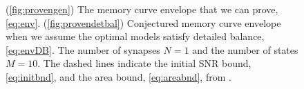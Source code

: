 \documentclass[12pt]{article}
\newenvironment{myenuma}{\begin{inparaenum}[(a)]}{\end{inparaenum}}
\begin{document}
\begin{figure}[tb]
  \centering
  \begin{myenuma}
  \item{}\label{fig:provengen}
  \item{}\label{fig:provendetbal}
  \end{myenuma}
  \caption[Proven envelope for the signal-to-noise ratio]
  {(\ref{fig:provengen}) The memory curve envelope that we can prove, \cref{eq:env}.
  (\ref{fig:provendetbal}) Conjectured memory curve envelope when we assume the optimal models satisfy detailed balance, \cref{eq:envDB}.
  The number of synapses \(N=1\) and the number of states \(M=10\).
  The dashed lines indicate the initial SNR bound, \eqref{eq:initbnd}, and the area bound, \eqref{eq:areabnd}, from \cite{Lahiri2013synapse}.}\label{fig:envproven}
\end{figure}
\end{document}
